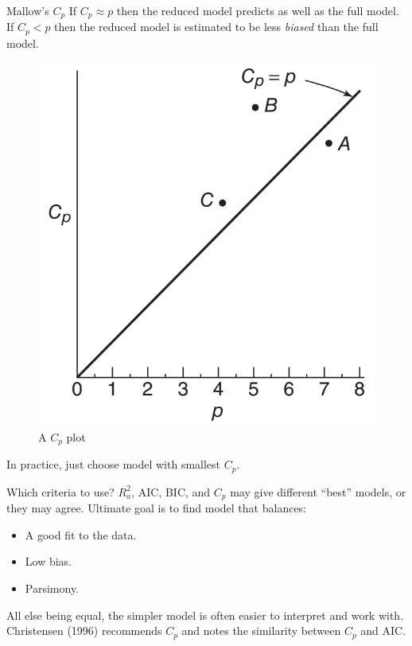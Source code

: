 \documentclass{beamer}
\begin{document}
\begin{frame}{Mallow's $C_p$}
If $C_p \approx p$ then the reduced model predicts as well as the full model. If $C_p < p$ then the reduced model is estimated to
be less \textit{biased} than the full model.

\begin{figure}
    \centering
    \includegraphics[height=.4\textheight]{plots/mallows_cp.png}
    \caption{A $C_p$ plot}
\end{figure}

\pause In practice, just choose model with smallest $C_p$.
\end{frame}

\begin{frame}{Which criteria to use?}
$R_a^2$, AIC, BIC, and $C_p$ may give different ``best'' models, or they
may agree. Ultimate goal is to find model that balances:
\begin{itemize}
\item\pause A good fit to the data.
\item\pause Low bias.
\item\pause Parsimony.
\end{itemize}
All else being equal, the simpler model is often easier to interpret
and work with. Christensen (1996) recommends $C_p$ and notes the
similarity between $C_p$ and AIC.
\end{frame}
\end{document}

